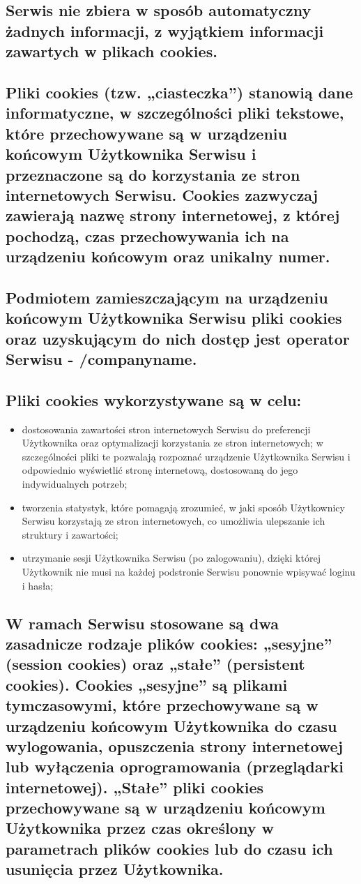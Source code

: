 

\subsection{Serwis nie zbiera w sposób automatyczny żadnych informacji, z wyjątkiem informacji zawartych w plikach cookies.}

\subsection{Pliki cookies (tzw. „ciasteczka”) stanowią dane informatyczne, w szczególności pliki tekstowe, które przechowywane są w urządzeniu końcowym Użytkownika Serwisu i przeznaczone są do korzystania ze stron internetowych Serwisu. Cookies zazwyczaj zawierają nazwę strony internetowej, z której pochodzą, czas przechowywania ich na urządzeniu końcowym oraz unikalny numer.}

\subsection{Podmiotem zamieszczającym na urządzeniu końcowym Użytkownika Serwisu pliki cookies oraz uzyskującym do nich dostęp jest operator Serwisu -  /companyname.}

\subsection{Pliki cookies wykorzystywane są w celu:}
\begin{itemize}
\item dostosowania zawartości stron internetowych Serwisu do preferencji Użytkownika oraz optymalizacji korzystania ze stron internetowych; w szczególności pliki te pozwalają rozpoznać urządzenie Użytkownika Serwisu i odpowiednio wyświetlić stronę internetową, dostosowaną do jego indywidualnych potrzeb;
\item tworzenia statystyk, które pomagają zrozumieć, w jaki sposób Użytkownicy Serwisu korzystają ze stron internetowych, co umożliwia ulepszanie ich struktury i zawartości;

\item utrzymanie sesji Użytkownika Serwisu (po zalogowaniu), dzięki której Użytkownik nie musi na każdej podstronie Serwisu ponownie wpisywać loginu i hasła;
\end{itemize}

\subsection{W ramach Serwisu stosowane są dwa zasadnicze rodzaje plików cookies: „sesyjne”  (session cookies) oraz „stałe” (persistent cookies). Cookies „sesyjne” są plikami tymczasowymi, które przechowywane są w urządzeniu końcowym Użytkownika do czasu wylogowania, opuszczenia strony internetowej lub wyłączenia oprogramowania (przeglądarki internetowej). „Stałe” pliki cookies przechowywane są w urządzeniu końcowym Użytkownika przez czas określony w parametrach plików cookies lub do czasu ich usunięcia przez Użytkownika.}

